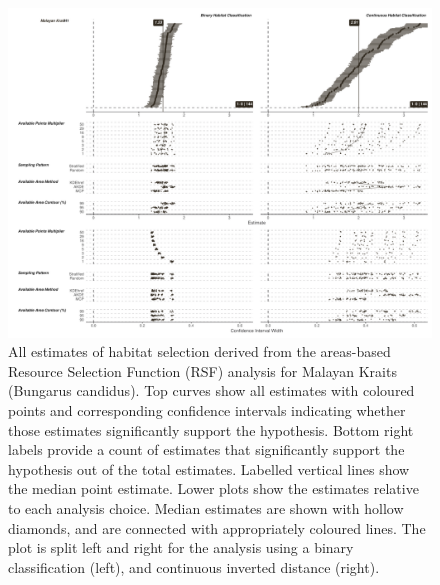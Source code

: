 \documentclass[10pt,a4paper]{article}
\begin{document}
\begin{figure}
\includegraphics[width=1\linewidth]{../../figures/specCurve_Malayan Krait_rsf} \caption{All estimates of habitat selection derived from the areas-based Resource Selection Function (RSF) analysis for Malayan Kraits (Bungarus candidus). Top curves show all estimates with coloured points and corresponding confidence intervals indicating whether those estimates significantly support the hypothesis. Bottom right labels provide a count of estimates that significantly support the hypothesis out of the total estimates. Labelled vertical lines show the median point estimate. Lower plots show the estimates relative to each analysis choice. Median estimates are shown with hollow diamonds, and are connected with appropriately coloured lines. The plot is split left and right for the analysis using a binary classification (left), and continuous inverted distance (right).}\label{fig:specCurveRsfBUCA}
\end{figure}
\end{document}
